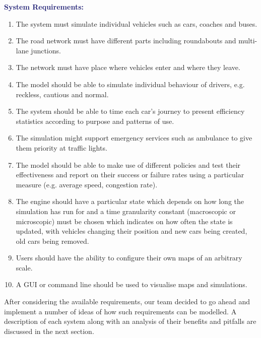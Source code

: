 \documentclass{article}
\begin{document}
{\bf\textcolor{MidnightBlue}{System Requirements:}}
\begin{enumerate}
	
	\item The system must simulate individual vehicles such as cars, coaches and buses.
	\item The road network must have different parts including roundabouts and multi-lane junctions. 
	\item The network must have place where vehicles enter and where they leave.
	\item The model should be able to simulate individual behaviour of drivers, e.g. reckless, cautious and normal. 
	\item The system should be able to time each car’s journey to present efficiency statistics according to purpose and patterns of use. 
	\item The simulation might support emergency services such as ambulance to give them priority at traffic lights.
	\item The model should be able to make use of different policies and test their effectiveness and report on their success or failure rates using a particular measure (e.g. average speed, congestion rate).
	\item The engine should have a particular state which depends on how long the simulation has run for and a time granularity constant (macroscopic or microscopic) must be chosen which indicates on how often the state is updated, with vehicles changing their position and new cars being created, old cars being removed.  
	\item Users should have the ability to configure their own maps of an arbitrary scale. 
	\item A GUI or command line should be used to visualise maps and simulations.
\end{enumerate}

\noindent
After considering the available requirements, our team decided to go ahead and implement a number of ideas of how such requirements can be modelled. A description of each system along with an analysis of their benefits and pitfalls are discussed in the next section. 
\end{document}
